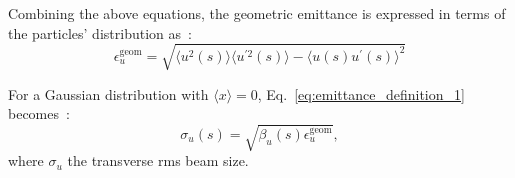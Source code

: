  Combining the above equations, the geometric emittance is expressed in terms of the particles' distribution as~\cite{wolski2014}:
 \begin{equation}\label{eq:geometric_emittance_v2}
     \epsilon^{\mathrm{geom}}_u = \sqrt{\langle u^2(s) \rangle \langle u^{\prime 2}(s) \rangle- \langle u (s)u^{\prime}(s) \rangle ^2}
 \end{equation}
 
For a Gaussian distribution with $\langle x \rangle=0$, Eq.~\eqref{eq:emittance_definition_1} becomes~\cite{wolski2014}: 
\begin{equation}\label{eq:emittance_beam_size}
    \sigma_u(s) = \sqrt{\beta_u(s) \epsilon^{\mathrm{geom}}_u},
\end{equation}
where $\sigma_u$ the transverse rms beam size.



 
 
